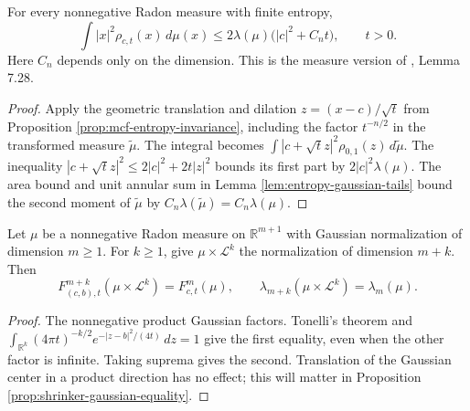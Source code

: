 \begin{proposition}\label{prop:entropy-gaussian-second-moment}
For every nonnegative Radon measure with finite entropy,
\[
 \int |x|^2\rho_{c,t}(x)\,d\mu(x)
 \leq2\lambda(\mu)\bigl(|c|^2+C_n t\bigr),\qquad t>0.
\]
Here $C_n$ depends only on the dimension. This is the measure version of \cite{CM12}, Lemma 7.28.
\end{proposition}
\begin{proof}
Apply the geometric translation and dilation $z=(x-c)/\sqrt t$ from Proposition \ref{prop:mcf-entropy-invariance}, including the factor $t^{-n/2}$ in the transformed measure $\widetilde\mu$. The integral becomes $\int|c+\sqrt t z|^2\rho_{0,1}(z)\,d\widetilde\mu$. The inequality $|c+\sqrt t z|^2\leq2|c|^2+2t|z|^2$ bounds its first part by $2|c|^2\lambda(\mu)$. The area bound and unit annular sum in Lemma \ref{lem:entropy-gaussian-tails} bound the second moment of $\widetilde\mu$ by $C_n\lambda(\widetilde\mu)=C_n\lambda(\mu)$.
\end{proof}

\begin{proposition}\label{prop:entropy-euclidean-product}
Let $\mu$ be a nonnegative Radon measure on $\mathbb R^{m+1}$ with Gaussian normalization of dimension $m\geq1$. For $k\geq1$, give $\mu\times\mathcal L^k$ the normalization of dimension $m+k$. Then
\[
 F^{m+k}_{(c,b),t}(\mu\times\mathcal L^k)=F^m_{c,t}(\mu),
 \qquad \lambda_{m+k}(\mu\times\mathcal L^k)=\lambda_m(\mu).
\]
\end{proposition}
\begin{proof}
The nonnegative product Gaussian factors. Tonelli's theorem and $\int_{\mathbb R^k}(4\pi t)^{-k/2}e^{-|z-b|^2/(4t)}\,dz=1$ give the first equality, even when the other factor is infinite. Taking suprema gives the second. Translation of the Gaussian center in a product direction has no effect; this will matter in Proposition \ref{prop:shrinker-gaussian-equality}.
\end{proof}

